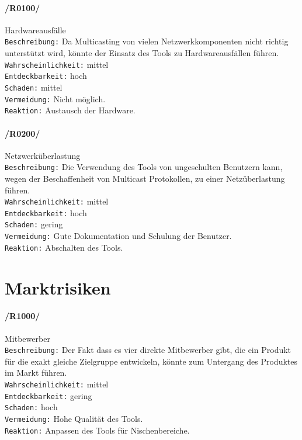 \paragraph{/R0100/}Hardwareausfälle \\
\texttt{Beschreibung:} Da Multicasting von vielen Netzwerkkomponenten nicht richtig unterstützt wird, könnte der Einsatz des Tools zu Hardwareausfällen führen.\\
\texttt{Wahrscheinlichkeit:} mittel\\
\texttt{Entdeckbarkeit:} hoch\\
\texttt{Schaden:} mittel\\
\texttt{Vermeidung:} Nicht möglich.\\
\texttt{Reaktion:} Austausch der Hardware.\\

\paragraph{/R0200/}Netzwerküberlastung\\
\texttt{Beschreibung:} Die Verwendung des Tools von ungeschulten Benutzern kann, wegen der Beschaffenheit von Multicast Protokollen, zu einer Netzüberlastung führen. \\
\texttt{Wahrscheinlichkeit:} mittel\\
\texttt{Entdeckbarkeit:} hoch\\
\texttt{Schaden:} gering\\
\texttt{Vermeidung:} Gute Dokumentation und Schulung der Benutzer.\\
\texttt{Reaktion:} Abschalten des Tools.\\

\section{Marktrisiken}
\label{sec:marketrisk}

\paragraph{/R1000/}Mitbewerber\\ 
\texttt{Beschreibung:} Der Fakt dass es vier direkte Mitbewerber gibt, die ein
Produkt für die exakt gleiche Zielgruppe entwickeln, könnte zum Untergang des
Produktes im Markt führen. \\ \texttt{Wahrscheinlichkeit:} mittel\\ \texttt{Entdeckbarkeit:} gering\\
\texttt{Schaden:} hoch\\
\texttt{Vermeidung:} Hohe Qualität des Tools.\\
\texttt{Reaktion:} Anpassen des Tools für Nischenbereiche.\\

